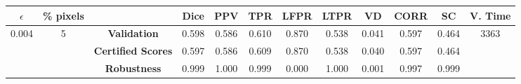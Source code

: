 \begin{longtable}{ c  c | c | c  c  c  c  c  c  c c c}
\toprule \textbf{$\epsilon$} & \textbf{\% pixels} & & \textbf{Dice} & \textbf{PPV} & \textbf{TPR} & \textbf{LFPR} & \textbf{LTPR} & \textbf{VD} & \textbf{CORR} & \textbf{SC} & \textbf{V. Time} \\
\midrule 
\multirow{3}{*}{0.004}  & \multirow{3}{*}{5} &\textbf{Validation} & 0.598 & 0.586 & 0.610 & 0.870 & 0.538 & 0.041 & 0.597 & 0.464 & \multirow{3}{*}{3363} \\
 & & \textbf{Certified Scores} & 0.597 & 0.586 & 0.609 & 0.870 & 0.538 & 0.040 & 0.597 & 0.464 & \\
& & \textbf{Robustness} & 0.999 & 1.000 & 0.999 & 0.000 & 1.000 & 0.001 & 0.997 & 0.999 & \\
\end{longtable}